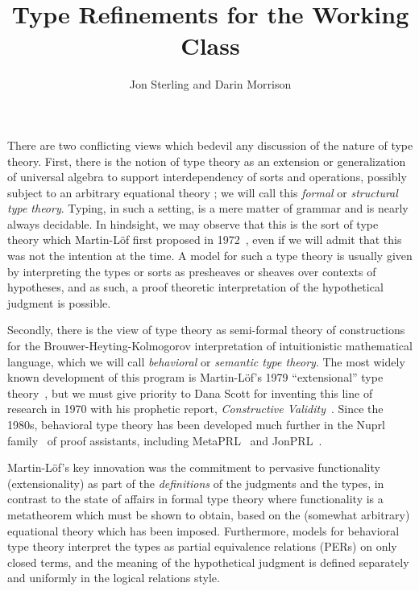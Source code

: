 \documentclass[11pt]{article}
\theoremstyle{definition}
\theoremstyle{notation}
\theoremstyle{remark}
\numberwithin{equation}{section}
\begin{document}
\title{Type Refinements for the Working Class}
\date{}
\author{Jon Sterling and Darin Morrison}
\maketitle

There are two conflicting views which bedevil any discussion of the nature of
type theory. First, there is the notion of type theory as an extension or
generalization of universal algebra to support interdependency of sorts and
operations, possibly subject to an arbitrary equational theory
\cite{cartmell:1986, dybjer:1996}; we will call this \emph{formal} or
\emph{structural type theory}.  Typing, in such a setting, is a mere matter of
grammar and is nearly always decidable. In hindsight, we may observe that this
is the sort of type theory which Martin-L\"of first proposed in
1972~\cite{martin-lof:1972}, even if we will admit that this was not the
intention at the time. A model for such a type theory is usually given by
interpreting the types or sorts as presheaves or sheaves over contexts of
hypotheses, and as such, a proof theoretic interpretation of the hypothetical
judgment is possible.

Secondly, there is the view of type theory as semi-formal theory of
constructions for the Brouwer-Heyting-Kolmogorov interpretation of
intuitionistic mathematical language, which we will call \emph{behavioral} or
\emph{semantic type theory}. The most widely known development of this program
is Martin-L\"of's 1979 ``extensional'' type theory~\cite{martin-lof:1979,
martin-lof:1984}, but we must give priority to Dana Scott for inventing this
line of research in 1970 with his prophetic report, \emph{Constructive
Validity}~\cite{scott:1970}. Since the 1980s, behavioral type theory has been
developed much further in the Nuprl family~\cite{constable:1986} of proof
assistants, including MetaPRL~\cite{hickey:2003} and JonPRL~\cite{jonprl:2015}.

Martin-L\"of's key innovation was the commitment to pervasive functionality
(extensionality) as part of the \emph{definitions} of the judgments and the
types, in contrast to the state of affairs in formal type theory where
functionality is a metatheorem which must be shown to obtain, based on the
(somewhat arbitrary) equational theory which has been imposed. Furthermore,
models for behavioral type theory interpret the types as partial equivalence
relations (PERs) on only closed terms, and the meaning of the hypothetical
judgment is defined separately and uniformly in the logical relations style.
\end{document}
